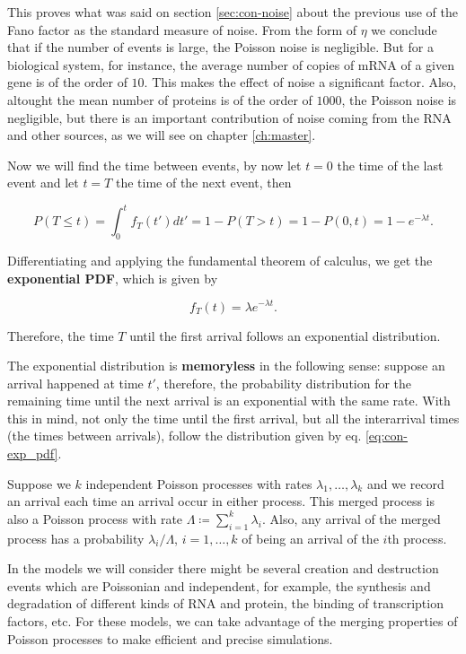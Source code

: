 This proves what was said on section \ref{sec:con-noise} about the previous use of the Fano factor as the standard measure of noise. From the form of $\eta$ we conclude that if the number of events is large, the Poisson noise is negligible. But for a biological system, for instance, the average number of copies of mRNA of a given gene is of the order of $10$. This makes the effect of noise a significant factor. Also, altought the mean number of proteins is of the order of $1000$, the Poisson noise is negligible, but there is an important contribution of noise coming from the RNA and other sources, as we will see on chapter \ref{ch:master}.

Now we will find the time between events, by now let $t=0$ the time of the last event and let $t=T$ the time of the next event, then

\begin{equation*}
  P(T\leq t) =\int_0^tf_T(t')dt'=1-P(T>t) = 1 - P(0,t) = 1 - e^{-\lambda t}.
\end{equation*}

Differentiating and applying the fundamental theorem of calculus, we get the \textbf{exponential PDF}, which is given by

\begin{equation*}
  \label{eq:con-exp_pdf}
  f_T(t) = \lambda e^{-\lambda t}.
\end{equation*}

Therefore, the time $T$ until the first arrival follows an exponential distribution. 

The exponential distribution is \textbf{memoryless} in the following sense: suppose an arrival happened at time $t'$, therefore, the probability distribution for the remaining time until the next arrival is an exponential with the same rate. With this in mind, not only the time until the first arrival, but all the interarrival times (the times between arrivals), follow the distribution given by eq. \eqref{eq:con-exp_pdf}.

Suppose we $k$ independent Poisson processes with rates $\lambda_1,\dotsc,\lambda_k$ and we record an arrival each time an arrival occur in either process. This merged process is also a Poisson process with rate $\Lambda\coloneqq\sum_{i=1}^k\lambda_i$. Also, any arrival of the merged process has a probability $\lambda_i/\Lambda$, $i=1,\dotsc,k$ of being an arrival of the $i$th process.

In the models we will consider there might be several creation and destruction events which are Poissonian and independent, for example, the synthesis and degradation of different kinds of RNA and protein, the binding of transcription factors, etc. For these models, we can take advantage of the merging properties of Poisson processes to make efficient and precise simulations.

